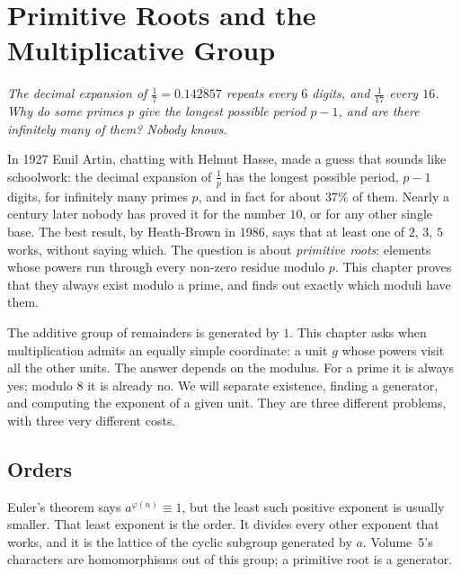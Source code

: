 \chapter{Primitive Roots and the Multiplicative Group}\label{ch:orders}

\begin{center}\itshape
The decimal expansion of $\frac17=0.\overline{142857}$ repeats every $6$ digits, and $\frac1{17}$ every $16$.\\
Why do some primes $p$ give the longest possible period $p-1$, and are there infinitely many of them? Nobody knows.
\end{center}

In 1927 Emil Artin, chatting with Helmut Hasse, made a guess that sounds like schoolwork: the decimal expansion of $\frac1p$ has the longest possible
period, $p-1$ digits, for infinitely many primes $p$, and in fact for about $37\%$ of them. Nearly a century later nobody has proved it for the number
$10$, or for any other single base. The best result, by Heath-Brown in 1986, says that at least one of $2$, $3$, $5$ works, without saying which. The
question is about \emph{primitive roots}: elements whose powers run through every non-zero residue modulo $p$. This chapter proves that they always
exist modulo a prime, and finds out exactly which moduli have them.

\begin{reminder}
The additive group of remainders is generated by $1$. This chapter asks when
multiplication admits an equally simple coordinate: a unit $g$ whose powers
visit all the other units. The answer depends on the modulus. For a prime it is
always yes; modulo $8$ it is already no. We will separate existence, finding a
generator, and computing the exponent of a given unit. They are three different
problems, with three very different costs.
\end{reminder}

\section{Orders}

Euler's theorem says $a^{\varphi(n)}\equiv 1$, but the least such positive exponent is usually smaller. That least exponent is the order. It divides every other exponent that works, and it is the lattice of the cyclic subgroup generated by $a$. Volume~5's characters are homomorphisms out of this group; a primitive root is a generator.

